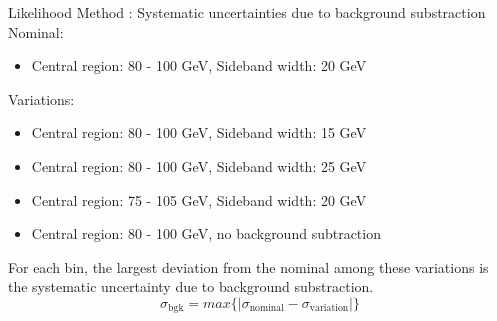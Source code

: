 \documentclass[mathserif,serif]{beamer}
\begin{document}
\begin{frame}{Likelihood Method : Systematic uncertainties due to background substraction}
Nominal:
\begin{itemize}
\item Central region: 80 - 100 GeV, Sideband width: 20 GeV
\end{itemize}
Variations:
\begin{itemize}
\item Central region: 80 - 100 GeV, Sideband width: 15 GeV
\item Central region: 80 - 100 GeV, Sideband width: 25 GeV
\item Central region: 75 - 105 GeV, Sideband width: 20 GeV
\item Central region: 80 - 100 GeV, no background subtraction
\end{itemize}
For each bin, the largest deviation from the nominal among these variations is the systematic uncertainty due to background substraction.
\begin{equation*}
\sigma_{\text{bgk}} = max\{| \sigma_{\text{nominal}} - \sigma_{\text{variation}} |\}
\end{equation*}
\end{frame}
\end{document}
